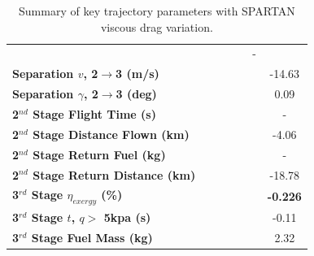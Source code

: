 \begin{table}[ht]
\begin{tabular}{l c c c c c c}
		& \secondthirdSeparationAltvCdFifty
		& \secondthirdSeparationAltvCdStandard
		& \secondthirdSeparationAltvCdOneHundredSeven
		& \secondthirdSeparationAltvCdOneHundredFifteen
		& -
		\\
		\textbf{Separation $v$, 2$\rightarrow$3 (m/s)}
		& \secondthirdSeparationvvCdTwenty
		& \secondthirdSeparationvvCdFifty
		& \secondthirdSeparationvvCdStandard
		& \secondthirdSeparationvvCdOneHundredSeven
		& \secondthirdSeparationvvCdOneHundredFifteen
		&-14.63
		\\
		\textbf{Separation $\gamma$, 2$\rightarrow$3 (deg)}
		& \secondthirdSeparationgammavCdTwenty
		& \secondthirdSeparationgammavCdFifty
		& \secondthirdSeparationgammavCdStandard
		& \secondthirdSeparationgammavCdOneHundredSeven
		& \secondthirdSeparationgammavCdOneHundredFifteen
		&0.09
		\\
		\textbf{2$^{nd}$ Stage Flight Time (s)}
		& \secondFlightTimevCdTwenty
		& \secondFlightTimevCdFifty
		& \secondFlightTimevCdStandard
		& \secondFlightTimevCdOneHundredSeven
		& \secondFlightTimevCdOneHundredFifteen
		& -
		\\
		\textbf{2$^{nd}$ Stage Distance Flown (km)}
		& \SecondDistvCdTwenty
		& \SecondDistvCdFifty
		& \SecondDistvCdStandard
		& \SecondDistvCdOneHundredSeven
		& \SecondDistvCdOneHundredFifteen
		&-4.06
		\\
		\textbf{2$^{nd}$ Stage Return Fuel (kg)}
		& \returnFuelvCdTwenty
		& \returnFuelvCdFifty
		& \returnFuelvCdStandard
		& \returnFuelvCdOneHundredSeven
		& \returnFuelvCdOneHundredFifteen
		& -
		\\
		\textbf{2$^{nd}$ Stage Return Distance (km)}
		& \returnDistvCdTwenty
		& \returnDistvCdFifty
		& \returnDistvCdStandard
		& \returnDistvCdOneHundredSeven
		& \returnDistvCdOneHundredFifteen
		&-18.78
		\\
		\hline 
		\textbf{3$^{rd}$ Stage $\eta_{exergy}$ (\%)}
		& \textbf{\thirddExergyEffvCdTwenty}
		& \textbf{\thirddExergyEffvCdFifty}
		& \textbf{\thirddExergyEffvCdStandard}
		& \textbf{\thirddExergyEffvCdOneHundredSeven}
		& \textbf{\thirddExergyEffvCdOneHundredFifteen}
		& \textbf{-0.226}
		\\
		\textbf{3$^{rd}$ Stage $t$, $q >$ 5kpa (s)}
		& \thirdqOverFivevCdTwenty
		& \thirdqOverFivevCdFifty
		& \thirdqOverFivevCdStandard
		& \thirdqOverFivevCdOneHundredSeven
		& \thirdqOverFivevCdOneHundredFifteen
		&-0.11
		\\
		\textbf{3$^{rd}$ Stage Fuel Mass (kg)}
		& \thirdmFuelvCdTwenty
		& \thirdmFuelvCdFifty
		& \thirdmFuelvCdStandard
		& \thirdmFuelvCdOneHundredSeven
		& \thirdmFuelvCdOneHundredFifteen
		&2.32
		\\
		\hline 
	\end{tabular} 
	\caption{Summary of key trajectory parameters with SPARTAN viscous drag variation.}
	\label{tab:viscous}
\end{table} 


